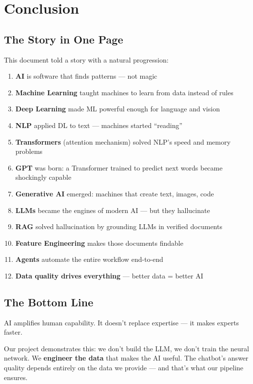 \documentclass[11pt,a4paper]{report}
\begin{document}
\chapter{Conclusion}

\section*{The Story in One Page}

This document told a story with a natural progression:

\begin{enumerate}
    \item \textbf{AI} is software that finds patterns --- not magic
    \item \textbf{Machine Learning} taught machines to learn from data instead of rules
    \item \textbf{Deep Learning} made ML powerful enough for language and vision
    \item \textbf{NLP} applied DL to text --- machines started ``reading''
    \item \textbf{Transformers} (attention mechanism) solved NLP's speed and memory problems
    \item \textbf{GPT} was born: a Transformer trained to predict next words became shockingly capable
    \item \textbf{Generative AI} emerged: machines that create text, images, code
    \item \textbf{LLMs} became the engines of modern AI --- but they hallucinate
    \item \textbf{RAG} solved hallucination by grounding LLMs in verified documents
    \item \textbf{Feature Engineering} makes those documents findable
    \item \textbf{Agents} automate the entire workflow end-to-end
    \item \textbf{Data quality drives everything} --- better data = better AI
\end{enumerate}

\section*{The Bottom Line}

AI amplifies human capability. It doesn't replace expertise --- it makes experts faster.

Our project demonstrates this: we don't build the LLM, we don't train the neural network. We \textbf{engineer the data} that makes the AI useful. The chatbot's answer quality depends entirely on the data we provide --- and that's what our pipeline ensures.
\end{document}
